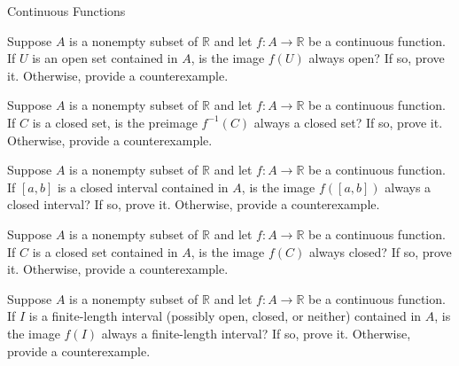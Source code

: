 \begin{section}{Continuous Functions}
\begin{problem}
Suppose $A$ is a nonempty subset of $\mathbb{R}$ and let $f:A\to \mathbb{R}$ be a continuous function. If $U$ is an open set contained in $A$, is the image $f(U)$ always open?  If so, prove it.  Otherwise, provide a counterexample.
\end{problem}


\begin{problem}
Suppose $A$ is a nonempty subset of $\mathbb{R}$ and let $f:A\to \mathbb{R}$ be a continuous function. If $C$ is a closed set, is the preimage $f^{-1}(C)$ always a closed set? If so, prove it.  Otherwise, provide a counterexample.
\end{problem}

\begin{problem}
Suppose $A$ is a nonempty subset of $\mathbb{R}$ and let $f:A\to \mathbb{R}$ be a continuous function. If $[a,b]$ is a closed interval contained in $A$, is the image $f([a,b])$ always a closed interval?  If so, prove it.  Otherwise, provide a counterexample.
\end{problem}

\begin{problem}
Suppose $A$ is a nonempty subset of $\mathbb{R}$ and let $f:A\to \mathbb{R}$ be a continuous function. If $C$ is a closed set contained in $A$, is the image $f(C)$ always closed?  If so, prove it.  Otherwise, provide a counterexample.
\end{problem}

\begin{problem}
Suppose $A$ is a nonempty subset of $\mathbb{R}$ and let $f:A\to \mathbb{R}$ be a continuous function. If $I$ is a finite-length interval (possibly open, closed, or neither) contained in $A$, is the image $f(I)$ always a finite-length interval?  If so, prove it.  Otherwise, provide a counterexample.
\end{problem}




\end{section}
